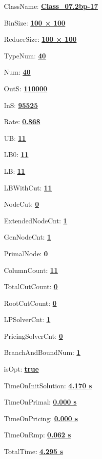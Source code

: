\documentclass[11pt]{article}
\begin{document}
\pagestyle{empty}


ClassName: \underline{\textbf{Class_07.2bp-17}}
\par
BinSize: \underline{\textbf{100 × 100}}
\par
ReduceSize: \underline{\textbf{100 × 100}}
\par
TypeNum: \underline{\textbf{40}}
\par
Num: \underline{\textbf{40}}
\par
OutS: \underline{\textbf{110000}}
\par
InS: \underline{\textbf{95525}}
\par
Rate: \underline{\textbf{0.868}}
\par
UB: \underline{\textbf{11}}
\par
LB0: \underline{\textbf{11}}
\par
LB: \underline{\textbf{11}}
\par
LBWithCut: \underline{\textbf{11}}
\par
NodeCut: \underline{\textbf{0}}
\par
ExtendedNodeCnt: \underline{\textbf{1}}
\par
GenNodeCnt: \underline{\textbf{1}}
\par
PrimalNode: \underline{\textbf{0}}
\par
ColumnCount: \underline{\textbf{11}}
\par
TotalCutCount: \underline{\textbf{0}}
\par
RootCutCount: \underline{\textbf{0}}
\par
LPSolverCnt: \underline{\textbf{1}}
\par
PricingSolverCnt: \underline{\textbf{0}}
\par
BranchAndBoundNum: \underline{\textbf{1}}
\par
isOpt: \underline{\textbf{true}}
\par
TimeOnInitSolution: \underline{\textbf{4.170 s}}
\par
TimeOnPrimal: \underline{\textbf{0.000 s}}
\par
TimeOnPricing: \underline{\textbf{0.000 s}}
\par
TimeOnRmp: \underline{\textbf{0.062 s}}
\par
TotalTime: \underline{\textbf{4.295 s}}
\par
\newpage


\end{document}
